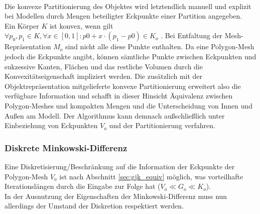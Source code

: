 \ \\
Die konvexe Partitionierung des Objektes wird letztendlich manuell und explizit bei Modellen durch Mengen beteiligter Eckpunkte einer Partition angegeben.\\
Ein Körper $K$ ist konvex, wenn gilt $\forall p_0, p_1 \in K, \forall x \in [0,1] : p0 + x \cdot  (p_1 - p0) \in K_o $ \cite[p.121]{morris2015finite}. Bei Entfaltung der Mesh-Repräsentation $M_o$ sind nicht alle diese Punkte enthalten. Da eine Polygon-Mesh jedoch die Eckpunkte angibt, können sämtliche Punkte zwischen Eckpunkten und sukzessive Kanten, Flächen und das restliche Volumen durch die Konvexitätseigenschaft impliziert werden. Die zusätzlich mit der Objektrepräsentation mitgelieferte konvexe Partitionierung erweitert also die verfügbare Information und schafft in dieser Hinsicht Äquivalenz zwischen Polygon-Meshes und kompakten Mengen und die Unterscheidung von Innen und Außen am Modell. Der Algorithmus kann demnach außschließlich unter Einbeziehung von Eckpunkten $V_o$ und der Partitionierung verfahren.

\subsubsection{Diskrete Minkowski-Differenz}
Eine Diskretisierung/Beschränkung auf die Information der Eckpunkte der Polygon-Mesh $V_o$ ist nach Abschnitt \ref{sec:gjk_equiv} möglich, was vorteilhafte Iterationslängen durch die Eingabe zur Folge hat ($V_o \ll G_o \ll K_o$).\\
In der Ausnutzung der Eigenschaften der Minkowski-Differenz muss nun allerdings der Umstand der Diskretion respektiert werden.

